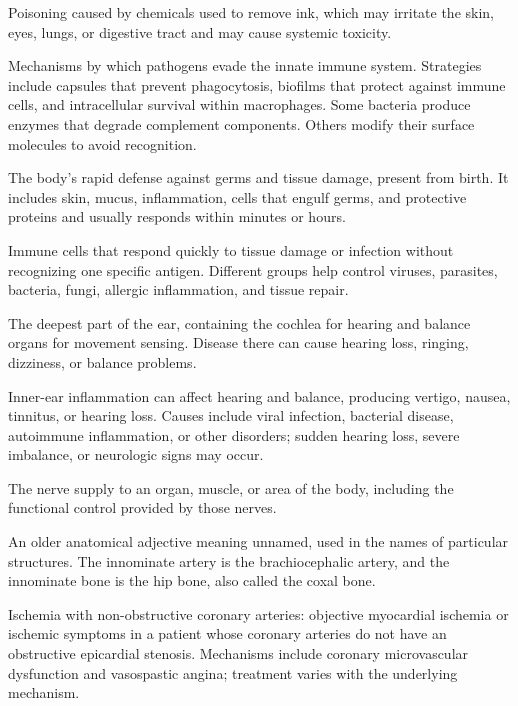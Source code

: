 Poisoning caused by chemicals used to remove ink, which may irritate the skin, eyes, lungs, or digestive tract and may cause systemic toxicity.

 Mechanisms by which pathogens evade the innate immune system. Strategies include
capsules that prevent phagocytosis, biofilms that protect against immune cells, and
intracellular survival within macrophages. Some bacteria produce enzymes that degrade
complement components. Others modify their surface molecules to avoid recognition.

 The body’s rapid defense against germs and tissue damage, present from birth. It includes skin, mucus, inflammation, cells that engulf germs, and protective proteins and usually responds within minutes or hours.

 Immune cells that respond quickly to tissue damage or infection without recognizing one specific antigen. Different groups help control viruses, parasites, bacteria, fungi, allergic inflammation, and tissue repair.

 The deepest part of the ear, containing the cochlea for hearing and balance organs for movement sensing. Disease there can cause hearing loss, ringing, dizziness, or balance problems.

 Inner-ear inflammation can affect hearing and balance, producing vertigo, nausea, tinnitus, or hearing loss. Causes include viral infection, bacterial disease, autoimmune inflammation, or other disorders; sudden hearing loss, severe imbalance, or neurologic signs may occur.

 The nerve supply to an organ, muscle, or area of the body, including the functional control provided by those nerves.

 An older anatomical adjective meaning unnamed, used in the names of particular structures. The innominate artery is the brachiocephalic artery, and the innominate bone is the hip bone, also called the coxal bone.

 Ischemia with non-obstructive coronary arteries: objective myocardial ischemia or ischemic symptoms in a patient whose coronary arteries do not have an obstructive epicardial stenosis. Mechanisms include coronary microvascular dysfunction and vasospastic angina; treatment varies with the underlying mechanism.


